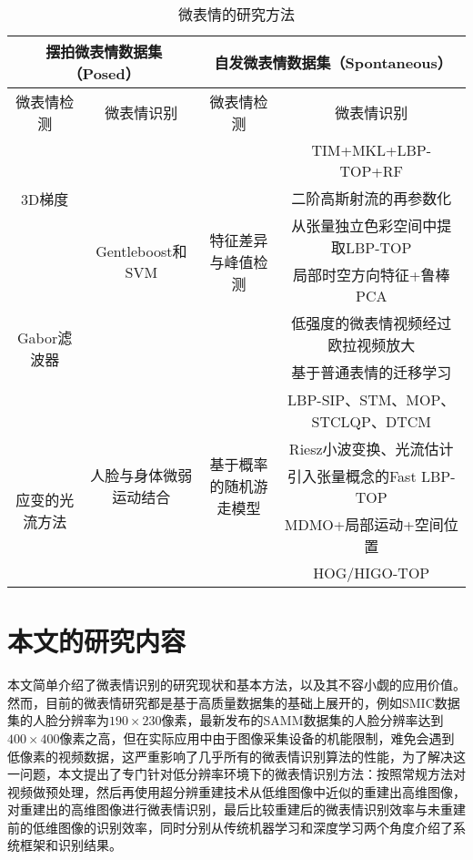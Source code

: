 \begin{table}[!htbp]
\centering
\caption{微表情的研究方法}
\label{tab1}
\footnotesize%
\setlength{\tabcolsep}{4pt}%
\renewcommand{\arraystretch}{1.2}%
\begin{tabular}{c|c|c|c}
\hline
\multicolumn{2}{c|}{摆拍微表情数据集（Posed）} & \multicolumn{2}{c}{自发微表情数据集（Spontaneous）} \\ \hline
微表情检测 & 微表情识别 & 微表情检测 & 微表情识别 \\ \hline
\multirow{3}{*}{3D梯度} & \multirow{6}{*}{Gentleboost和SVM} & \multirow{6}{*}{特征差异与峰值检测} & TIM+MKL+LBP-TOP+RF \\
 &  &  & 二阶高斯射流的再参数化 \\
 &  &  & 从张量独立色彩空间中提取LBP-TOP \\
\multirow{4}{*}{Gabor滤波器} &  &  & 局部时空方向特征+鲁棒PCA \\
 &  &  & 低强度的微表情视频经过欧拉视频放大 \\
 &  &  & 基于普通表情的迁移学习 \\
 & \multirow{5}{*}{人脸与身体微弱运动结合} & \multirow{5}{*}{基于概率的随机游走模型} & LBP-SIP、STM、MOP、STCLQP、DTCM \\
\multirow{4}{*}{应变的光流方法} &  &  & Riesz小波变换、光流估计 \\
 &  &  & 引入张量概念的Fast LBP-TOP \\
 &  &  & MDMO+局部运动+空间位置 \\
 &  &  & HOG/HIGO-TOP \\ \hline
\end{tabular}
\end{table}

\section{本文的研究内容}

本文简单介绍了微表情识别的研究现状和基本方法，以及其不容小觑的应用价值。然而，目前的微表情研究都是基于高质量数据集的基础上展开的，例如SMIC数据集的人脸分辨率为$190\times230$像素，最新发布的SAMM数据集的人脸分辨率达到$400\times400$像素之高，但在实际应用中由于图像采集设备的机能限制，难免会遇到低像素的视频数据，这严重影响了几乎所有的微表情识别算法的性能，为了解决这一问题，本文提出了专门针对低分辨率环境下的微表情识别方法：按照常规方法对视频做预处理，然后再使用超分辨重建技术从低维图像中近似的重建出高维图像，对重建出的高维图像进行微表情识别，最后比较重建后的微表情识别效率与未重建前的低维图像的识别效率，同时分别从传统机器学习和深度学习两个角度介绍了系统框架和识别结果。

